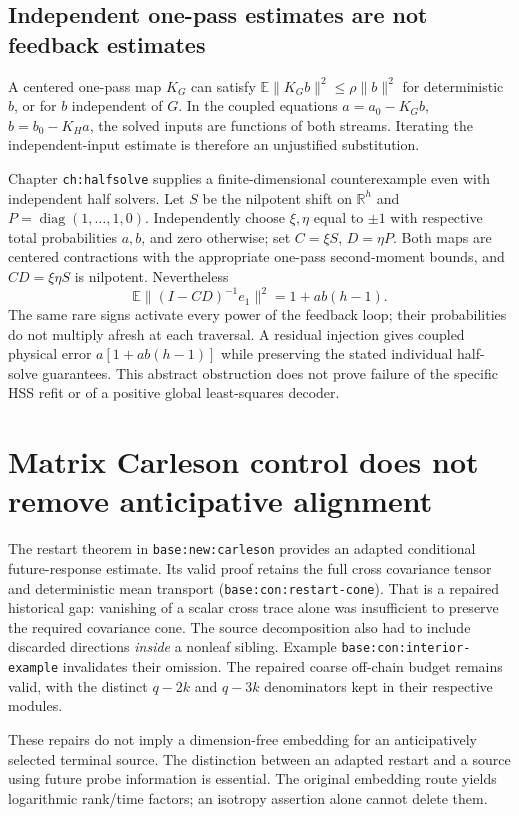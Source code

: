 \documentclass[11pt,oneside,openany,a4paper]{report}
\numberwithin{equation}{chapter}
\theoremstyle{definition}
\theoremstyle{remark}
\begin{document}
\subsection{Independent one-pass estimates are not feedback estimates}

A centered one-pass map $K_G$ can satisfy
$\mathbb E\|K_Gb\|^2\le\rho\|b\|^2$ for deterministic $b$, or for
$b$ independent of $G$.  In the coupled equations
$a=a_0-K_Gb$, $b=b_0-K_Ha$, the solved inputs are functions of both
streams.  Iterating the independent-input estimate is therefore an
unjustified substitution.

Chapter \texttt{ch:halfsolve} supplies a finite-dimensional
counterexample even with independent half solvers.  Let $S$ be the
nilpotent shift on $\mathbb R^h$ and
$P=\operatorname{diag}(1,\ldots,1,0)$.  Independently choose
$\xi,\eta$ equal to $\pm1$ with respective total probabilities $a,b$,
and zero otherwise; set $C=\xi S$, $D=\eta P$.  Both maps are centered
contractions with the appropriate one-pass second-moment bounds, and
$CD=\xi\eta S$ is nilpotent.  Nevertheless
\[
 \mathbb E\|(I-CD)^{-1}e_1\|^2=1+ab(h-1).
\]
The same rare signs activate every power of the feedback loop; their
probabilities do not multiply afresh at each traversal.  A residual
injection gives coupled physical error
$a[1+ab(h-1)]$ while preserving the stated individual half-solve
guarantees.  This abstract obstruction does not prove failure of the
specific HSS refit or of a positive global least-squares decoder.

\section{Matrix Carleson control does not remove anticipative alignment}
\label{origobs:embedding}

The restart theorem in \texttt{base:new:carleson} provides an adapted
conditional future-response estimate.  Its valid proof retains the
full cross covariance tensor and deterministic mean transport
(\texttt{base:con:restart-cone}).  That is a repaired historical gap:
vanishing of a scalar cross trace alone was insufficient to preserve
the required covariance cone.  The source decomposition also had to
include discarded directions \emph{inside} a nonleaf sibling.
Example \texttt{base:con:interior-example} invalidates their omission.
The repaired coarse off-chain budget remains valid, with the distinct
$q-2k$ and $q-3k$ denominators kept in their respective modules.

These repairs do not imply a dimension-free embedding for an
anticipatively selected terminal source.  The distinction between an
adapted restart and a source using future probe information is
essential.  The original embedding route yields logarithmic
rank/time factors; an isotropy assertion alone cannot delete them.
\end{document}
